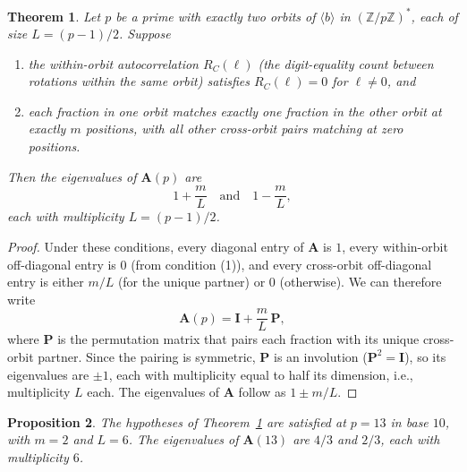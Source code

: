 \documentclass[12pt]{amsart}
\newtheorem{theorem}{Theorem}
\newtheorem{proposition}[theorem]{Proposition}
\theoremstyle{definition}
\theoremstyle{remark}
\begin{document}
\begin{theorem}\label{thm:two-coset}
Let $p$ be a prime with exactly two orbits of $\langle b
\rangle$ in $(\mathbb{Z}/p\mathbb{Z})^*$, each of size
$L = (p{-}1)/2$. Suppose
\begin{enumerate}
\item the within-orbit autocorrelation
$R_C(\ell)$ (the digit-equality count between rotations
within the same orbit) satisfies $R_C(\ell) = 0$ for
$\ell \ne 0$, and
\item each fraction in one orbit matches exactly one
fraction in the other orbit at exactly $m$ positions, with
all other cross-orbit pairs matching at zero positions.
\end{enumerate}
Then the eigenvalues of $\mathbf{A}(p)$ are
\[
1 + \frac{m}{L} \quad \text{and} \quad 1 - \frac{m}{L},
\]
each with multiplicity $L = (p{-}1)/2$.
\end{theorem}

\begin{proof}
Under these conditions, every diagonal entry of $\mathbf{A}$
is $1$, every within-orbit off-diagonal entry is $0$ (from
condition (1)), and every cross-orbit off-diagonal entry is
either $m/L$ (for the unique partner) or $0$ (otherwise).
We can therefore write
\[
\mathbf{A}(p) = \mathbf{I} + \frac{m}{L}\, \mathbf{P},
\]
where $\mathbf{P}$ is the permutation matrix that pairs each
fraction with its unique cross-orbit partner. Since the
pairing is symmetric, $\mathbf{P}$ is an involution
($\mathbf{P}^2 = \mathbf{I}$), so its eigenvalues are
$\pm 1$, each with multiplicity equal to half its dimension,
i.e., multiplicity $L$ each. The eigenvalues of $\mathbf{A}$
follow as $1 \pm m/L$.
\end{proof}

\begin{proposition}\label{prop:p13-verify}
The hypotheses of Theorem~\ref{thm:two-coset} are satisfied
at $p = 13$ in base $10$, with $m = 2$ and $L = 6$.
The eigenvalues of $\mathbf{A}(13)$ are $4/3$ and $2/3$,
each with multiplicity $6$.
\end{proposition}
\end{document}
